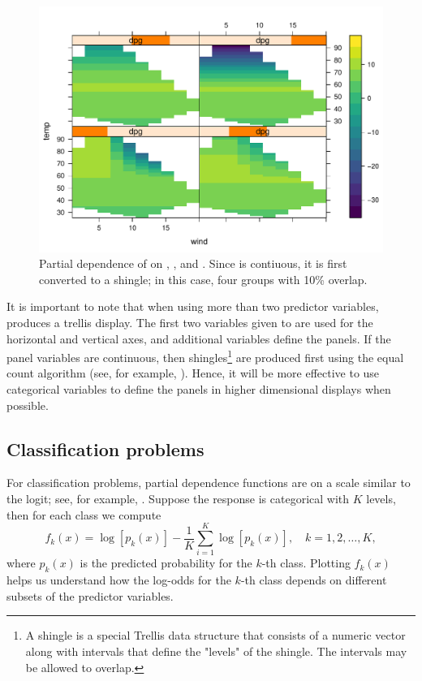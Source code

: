 \begin{figure}[!htbp]
  \centering
  \includegraphics[width=0.8\linewidth]{partial_par}
  \caption{Partial dependence of  on , , and . Since  is contiuous, it is first converted to a shingle; in this case, four groups with 10\% overlap.}
  \label{fig:partial_par}
\end{figure}

It is important to note that when using more than two predictor variables,  produces a trellis display. The first two variables given to  are used for the horizontal and vertical axes, and additional variables define the panels. If the panel variables are continuous, then shingles\footnote{A shingle is a special Trellis data structure that consists of a numeric vector along with intervals that define the "levels" of the shingle. The intervals may be allowed to overlap.} are produced first using the equal count algorithm (see, for example, ). Hence, it will be more effective to use categorical variables to define the panels in higher dimensional displays when possible.


\subsection{Classification problems}

For classification problems, partial dependence functions are on a scale similar to the logit; see, for example, \citet[pp. 369---370]{hastie-elements-2009}. Suppose the response is categorical with $K$ levels, then for each class we compute
\begin{equation}
\label{eqn:avg-logit}
f_k(x) = \log\left[p_k(x)\right] - \frac{1}{K}\sum_{i = 1}^K\log\left[p_k(x)\right], \quad k = 1, 2, \dots, K,
\end{equation}
where $p_k(x)$ is the predicted probability for the $k$-th class. Plotting $f_k(x)$ helps us understand how the log-odds for the $k$-th class depends on different subsets of the predictor variables.

